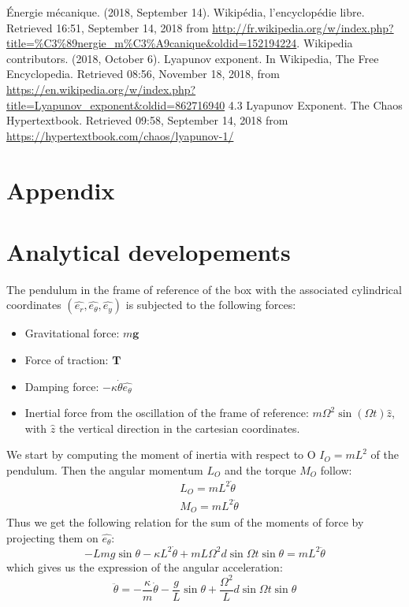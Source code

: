 \documentclass[a4paper,12pt,twoside]{article}
\begin{document}
\begin{thebibliography}{99}
	 Énergie mécanique. (2018, September 14). Wikipédia, l'encyclopédie libre. Retrieved 16:51, September 14, 2018 from \url{http://fr.wikipedia.org/w/index.php?title=%C3%89nergie_m%C3%A9canique&oldid=152194224}.
	 Wikipedia contributors. (2018, October 6). Lyapunov exponent. In Wikipedia, The Free Encyclopedia. Retrieved 08:56, November 18, 2018, from \url{https://en.wikipedia.org/w/index.php?title=Lyapunov_exponent&oldid=862716940}
	 4.3 Lyapunov Exponent. The Chaos Hypertextbook. Retrieved 09:58, September 14, 2018 from \url{https://hypertextbook.com/chaos/lyapunov-1/}

\end{thebibliography}

\section*{Appendix}
\appendix

\section{Analytical developements}
The pendulum in the frame of reference of the box with the associated cylindrical coordinates $(\hat{e_r}, \hat{e_\theta}, \hat{e_y})$ is subjected to the following forces:
\begin{itemize}
	\item Gravitational force: $m\mathbf{g}$
	\item Force of traction: $\mathbf{T}$
	\item Damping force: $-\kappa \dot{\theta} \hat{e_\theta}$
	\item Inertial force from the oscillation of the frame of reference: $m \Omega^2 \sin(\Omega t) \hat{z}$, with $\hat{z}$ the vertical direction in the cartesian coordinates.
\end{itemize}

We start by computing the moment of inertia with respect to O $I_O = mL^2$ of the pendulum. Then the angular momentum $L_O$ and the torque $M_O$ follow:
\begin{align*}
	&L_O = mL^2\dot{\theta}\\
	&M_O = mL^2\ddot{\theta}
\end{align*}
Thus we get the following relation for the sum of the moments of force by projecting them on $\hat{e_\theta}$:
\begin{equation*}
-Lmg\sin\theta-\kappa L^2\dot{\theta} + mL\Omega^2 d \sin{\Omega t} \sin\theta = mL^2\ddot{\theta}
\end{equation*}
which gives us the expression of the angular acceleration:
\begin{equation*}
\ddot{\theta} = -\frac{\kappa}{m}\dot{\theta} - \frac{g}{L}\sin\theta + \frac{\Omega^2}{L} d \sin{\Omega t} \sin\theta
\end{equation*}
\end{document}
